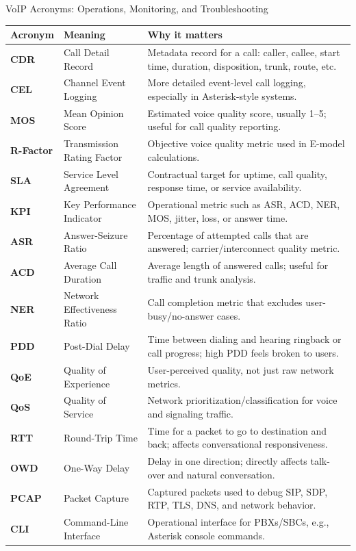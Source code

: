 \documentclass[aspectratio=169]{beamer}
\begin{document}
\begin{frame}{VoIP Acronyms: Operations, Monitoring, and Troubleshooting}
\tiny

\begin{tabular}{p{1.7cm} p{3.4cm} p{6.9cm}}
\toprule
\textbf{Acronym} & \textbf{Meaning} & \textbf{Why it matters} \\
\midrule
\textbf{CDR} & Call Detail Record & Metadata record for a call: caller, callee, start time, duration, disposition, trunk, route, etc. \\
\textbf{CEL} & Channel Event Logging & More detailed event-level call logging, especially in Asterisk-style systems. \\
\textbf{MOS} & Mean Opinion Score & Estimated voice quality score, usually 1--5; useful for call quality reporting. \\
\textbf{R-Factor} & Transmission Rating Factor & Objective voice quality metric used in E-model calculations. \\
\textbf{SLA} & Service Level Agreement & Contractual target for uptime, call quality, response time, or service availability. \\
\textbf{KPI} & Key Performance Indicator & Operational metric such as ASR, ACD, NER, MOS, jitter, loss, or answer time. \\
\textbf{ASR} & Answer-Seizure Ratio & Percentage of attempted calls that are answered; carrier/interconnect quality metric. \\
\textbf{ACD} & Average Call Duration & Average length of answered calls; useful for traffic and trunk analysis. \\
\textbf{NER} & Network Effectiveness Ratio & Call completion metric that excludes user-busy/no-answer cases. \\
\textbf{PDD} & Post-Dial Delay & Time between dialing and hearing ringback or call progress; high PDD feels broken to users. \\
\textbf{QoE} & Quality of Experience & User-perceived quality, not just raw network metrics. \\
\textbf{QoS} & Quality of Service & Network prioritization/classification for voice and signaling traffic. \\
\textbf{RTT} & Round-Trip Time & Time for a packet to go to destination and back; affects conversational responsiveness. \\
\textbf{OWD} & One-Way Delay & Delay in one direction; directly affects talk-over and natural conversation. \\
\textbf{PCAP} & Packet Capture & Captured packets used to debug SIP, SDP, RTP, TLS, DNS, and network behavior. \\
\textbf{CLI} & Command-Line Interface & Operational interface for PBXs/SBCs, e.g., Asterisk console commands. \\
\bottomrule
\end{tabular}


\end{frame}
\end{document}
